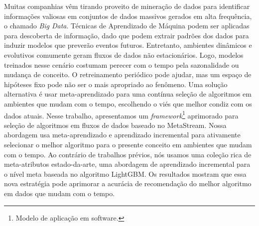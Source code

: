 Muitas companhias vêm tirando proveito de mineração de dados para identificar informações valiosas em conjuntos de dados massivos gerados em alta frequência, o chamado \textit{Big Data}. Técnicas de Aprendizado de Máquina podem ser aplicadas para descoberta de informação, dado que podem extrair padrões dos dados para induzir modelos que preverão eventos futuros. Entretanto, ambientes dinâmicos e evolutivos comumente geram fluxos de dados não estacionários. Logo, modelos treinados nesse cenário costumam perecer com o tempo pela sazonalidade ou mudança de conceito. O retreinamento periódico pode ajudar, mas um espaço de hipóteses fixo pode não ser o mais apropriado ao fenômeno. Uma solução alternativa é usar meta-aprendizado para uma contínua seleção de algoritmos em ambientes que mudam com o tempo, escolhendo o viés que melhor condiz com os dados atuais. Nesse trabalho, apresentamos um \textit{framework}\footnote{Modelo de aplicação em software.} aprimorado para seleção de algoritmos em fluxos de dados baseado no MetaStream. Nossa abordagem usa meta-aprendizado e aprendizado incremental para ativamente selecionar o melhor algoritmo para o presente conceito em ambientes que mudam com o tempo. Ao contrário de trabalhos prévios, nós usamos uma coleção rica de meta-atributos estado-da-arte, uma abordagem de aprendizado incremental para o nível meta baseada no algoritmo LightGBM. Os resultados mostram que essa nova estratégia pode aprimorar a acurácia de recomendação do melhor algoritmo em dados que mudam com o tempo.